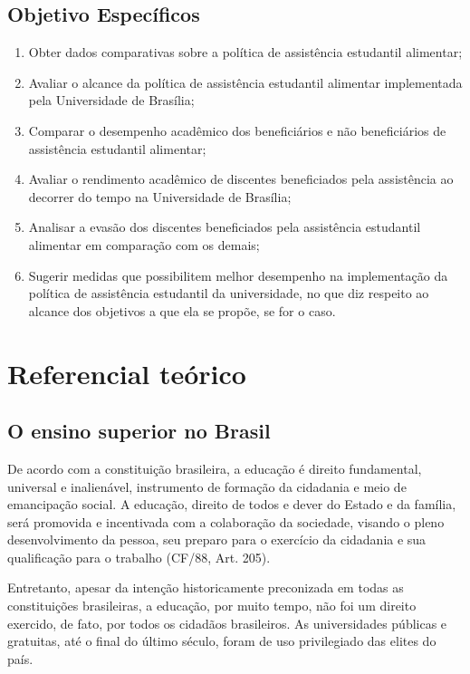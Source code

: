 \subsection{Objetivo Específicos}
\begin{enumerate}
	\item Obter dados comparativas sobre a política de assistência estudantil alimentar;
	\item Avaliar o alcance da política de assistência estudantil alimentar implementada pela Universidade de Brasília;
	\item Comparar o desempenho acadêmico dos beneficiários e não beneficiários de assistência estudantil alimentar;
	\item Avaliar o rendimento acadêmico de discentes beneficiados pela assistência ao decorrer do tempo na Universidade de Brasília; 
	\item Analisar a evasão dos discentes beneficiados pela assistência estudantil alimentar em comparação com os demais;
	\item Sugerir medidas que possibilitem melhor desempenho na implementação da política de assistência estudantil da universidade, no que diz respeito ao alcance dos objetivos a que ela se propõe, se for o caso.
\end{enumerate}%

\section{Referencial teórico}


\subsection{O ensino superior no Brasil}

De acordo com a constituição brasileira, a educação é direito fundamental, universal e inalienável, instrumento de formação da cidadania e meio de emancipação social. A educação, direito de todos e dever do Estado e da família, será promovida e incentivada com a colaboração da sociedade, visando o pleno desenvolvimento da pessoa, seu preparo para o exercício da cidadania e sua qualificação para o trabalho (CF/88, Art. 205).

Entretanto, apesar da intenção historicamente preconizada em todas as constituições brasileiras, a educação, por muito tempo, não foi um direito exercido, de fato, por todos os cidadãos brasileiros. As universidades públicas e gratuitas, até o final do último século, foram de uso privilegiado das elites do país.

